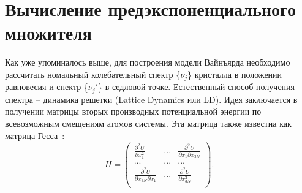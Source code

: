 \documentclass[master,14pt,subf,href,colorlinks=true
]{disser}
\begin{document}
\section{Вычисление предэкспоненциального множителя}\label{chapter_frequency}
Как уже упоминалось выше, для построения модели Вайнъярда необходимо рассчитать номальный колебательный спектр \{$\nu_j$\} кристалла в положении равновесия и спектр \{$\nu_j'$\} в седловой точке. Естественный способ получения спектра -- динамика решетки (Lattice Dynamics или LD). Идея заключается в получении матрицы вторых производных потенциальной энергии по всевозможным смещениям атомов системы. Эта матрица также известна как матрица Гесса~\cite{Landau_1}:
\begin{equation}
H = \left( \begin{array}{ccc}
\frac{\partial^2 U}{\partial x_1^2} & ... & \frac{\partial^2 U}{\partial x_1 \partial x_{3N}} \\
... & ... & ... \\
\frac{\partial^2 U}{\partial x_{3N} \partial x_1} & ... & \frac{\partial^2 U}{\partial x_{3N}^2}\\ 
\end{array} \right).
\end{equation}
\end{document}
